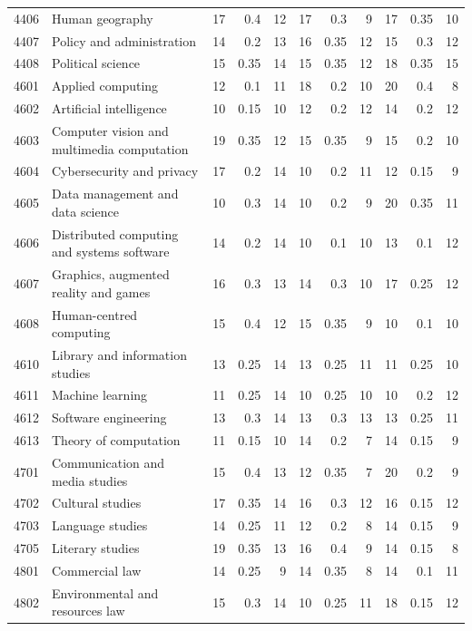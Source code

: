 \begin{longtable}{r p{2.15cm} rrr rrr rrr}
4406 & Human geography & 17 & 0.4 & 12 & 17 & 0.3 & 9 & 17 & 0.35 & 10 \\
4407 & Policy and administration & 14 & 0.2 & 13 & 16 & 0.35 & 12 & 15 & 0.3 & 12 \\
4408 & Political science & 15 & 0.35 & 14 & 15 & 0.35 & 12 & 18 & 0.35 & 15 \\
4601 & Applied computing & 12 & 0.1 & 11 & 18 & 0.2 & 10 & 20 & 0.4 & 8 \\
4602 & Artificial intelligence & 10 & 0.15 & 10 & 12 & 0.2 & 12 & 14 & 0.2 & 12 \\
4603 & Computer vision and multimedia computation & 19 & 0.35 & 12 & 15 & 0.35 & 9 & 15 & 0.2 & 10 \\
4604 & Cybersecurity and privacy & 17 & 0.2 & 14 & 10 & 0.2 & 11 & 12 & 0.15 & 9 \\
4605 & Data management and data science & 10 & 0.3 & 14 & 10 & 0.2 & 9 & 20 & 0.35 & 11 \\
4606 & Distributed computing and systems software & 14 & 0.2 & 14 & 10 & 0.1 & 10 & 13 & 0.1 & 12 \\
4607 & Graphics, augmented reality and games & 16 & 0.3 & 13 & 14 & 0.3 & 10 & 17 & 0.25 & 12 \\
4608 & Human-centred computing & 15 & 0.4 & 12 & 15 & 0.35 & 9 & 10 & 0.1 & 10 \\
4610 & Library and information studies & 13 & 0.25 & 14 & 13 & 0.25 & 11 & 11 & 0.25 & 10 \\
4611 & Machine learning & 11 & 0.25 & 14 & 10 & 0.25 & 10 & 10 & 0.2 & 12 \\
4612 & Software engineering & 13 & 0.3 & 14 & 13 & 0.3 & 13 & 13 & 0.25 & 11 \\
4613 & Theory of computation & 11 & 0.15 & 10 & 14 & 0.2 & 7 & 14 & 0.15 & 9 \\
4701 & Communication and media studies & 15 & 0.4 & 13 & 12 & 0.35 & 7 & 20 & 0.2 & 9 \\
4702 & Cultural studies & 17 & 0.35 & 14 & 16 & 0.3 & 12 & 16 & 0.15 & 12 \\
4703 & Language studies & 14 & 0.25 & 11 & 12 & 0.2 & 8 & 14 & 0.15 & 9 \\
4705 & Literary studies & 19 & 0.35 & 13 & 16 & 0.4 & 9 & 14 & 0.15 & 8 \\
4801 & Commercial law & 14 & 0.25 & 9 & 14 & 0.35 & 8 & 14 & 0.1 & 11 \\
4802 & Environmental and resources law & 15 & 0.3 & 14 & 10 & 0.25 & 11 & 18 & 0.15 & 12 \\

\end{longtable}
